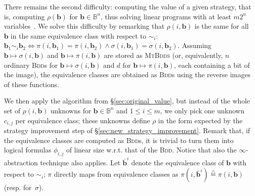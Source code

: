 \documentclass{llncs}
\newcommand{\rronly}[1]{#1}
\newcommand{\BB}{\mathbb{B}}
\newcommand{\eqvclass}[2]{\bar{#1}^{#2}}
\newcommand{\sleq}{\!\leq\!}
\newcommand{\defn}{\stackrel{\triangle}{=}}
\renewcommand{\vec}[1]{{\boldsymbol #1}}
\begin{document}
There remains the second difficulty: computing the value of a given
strategy, that is, computing $\rho(\vec{b})$ for $\vec{b} \in \BB^n$,
thus solving linear programs with at least $m2^n$
variables~\cite[\S6.4]{Gawlitza_Monniaux_LMCS12}.  We solve this
difficulty by remarking that $\rho(i,\vec{b})$ is the same for all
$\vec{b}$ in the same equivalence class with respect to $\sim_i$:
$\vec{b}_1 \sim_i \vec{b}_2 \iff \pi(i,\vec{b}_1) = \pi(i,\vec{b}_2)
\land \sigma(i,\vec{b}_1) = \sigma(i,\vec{b}_2)$.  Assuming $\vec{b}
\mapsto \sigma(i,\vec{b})$ and $\vec{b} \mapsto \pi(i,\vec{b})$ are
stored as \textsc{MtBdds}\rronly{ (or, equivalently, $n$ ordinary
  \textsc{Bdd}s for $\vec{b} \mapsto \sigma(i,\vec{b})$ and $d$ for
  $\vec{b} \mapsto \pi(i,\vec{b})$, each containing a bit of the
  image)}, the equivalence classes are obtained as \textsc{Bdd}s using
the reverse images of these functions.

We then apply the algorithm from \S\ref{sec:original_value}, but
instead of the whole set of $\rho(i,\vec{b})$ unknowns for $\vec{b}
\in \BB^n$ and $1 \sleq i \sleq m$, we only pick one unknown $c_{i,j}$
per equivalence class; these unknowns define $\rho$ in the form
expected by the strategy improvement step of
\S\ref{sec:new_strategy_improvement}.
Remark that, if the equivalence classes are computed as \textsc{Bdd}s,
it is trivial to turn them into logical formulas $\phi_{i,j}$ of
linear size w.r.t. that of the \textsc{Bdd}.  Notice that also the
$\infty$-abstraction technique
\cite[\S8,9]{Gawlitza:2011:SSR:1961204.1961207} also applies.
Let $\eqvclass{\vec{b}}{i}$ denote the equivalence class of $\vec{b}$
with respect to $\sim_i$; $\pi$ directly maps from equivalence classes
as $\pi(i,\eqvclass{\vec{b}}{i}) \defn \pi(i,\vec{b})$
(resp. for~$\sigma$).
\end{document}
